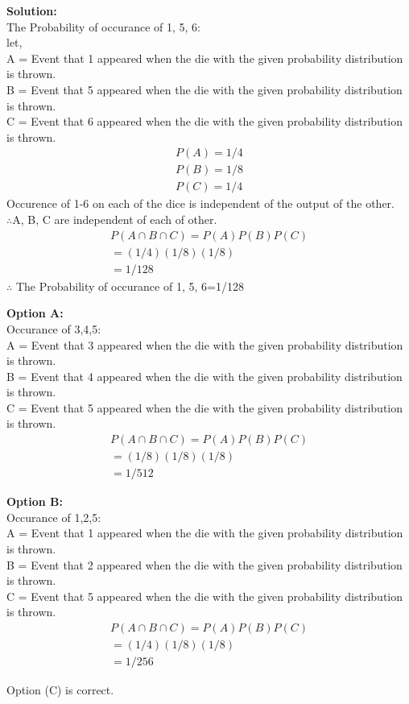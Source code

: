 \documentclass[journal]{IEEEtran}
\begin{document}
\textbf{Solution:}\\
The Probability of occurance of 1, 5, 6:\\
let,\\
A = Event that 1 appeared when the die with the given probability distribution is thrown.\\
B = Event that 5 appeared when the die with the given probability distribution is thrown.\\
C = Event that 6 appeared when the die with the given probability distribution is thrown.\\
\begin{align}
    P(A) = 1/4\\
    P(B) = 1/8\\
    P(C) =1/4
\end{align}
Occurence of 1-6 on each of the dice is independent of the output of the other.\\
$\therefore$A, B, C are independent of each of other.
\begin{align}
    P(A \cap B \cap C)=P(A) P(B)P(C)\\
    =(1/4)(1/8)(1/8)\\
    =1/128
\end{align}
$\therefore$ The Probability of occurance of 1, 5, 6=1/128

\textbf{Option A:}\\
Occurance of 3,4,5:\\
A = Event that 3 appeared when the die with the given probability distribution is thrown.\\
B = Event that 4 appeared when the die with the given probability distribution is thrown.\\
C = Event that 5 appeared when the die with the given probability distribution is thrown.\\
\begin{align}
    P(A \cap B \cap C)=P(A) P(B)P(C)\\
    =(1/8)(1/8)(1/8)\\
    =1/512
\end{align}

\textbf{Option B:}\\
Occurance of 1,2,5:\\
A = Event that 1 appeared when the die with the given probability distribution is thrown.\\
B = Event that 2 appeared when the die with the given probability distribution is thrown.\\
C = Event that 5 appeared when the die with the given probability distribution is thrown.\\
\begin{align}
    P(A \cap B \cap C)=P(A) P(B)P(C)\\
    =(1/4)(1/8)(1/8)\\
    =1/256
\end{align}

Option (C) is correct.
\end{document}
